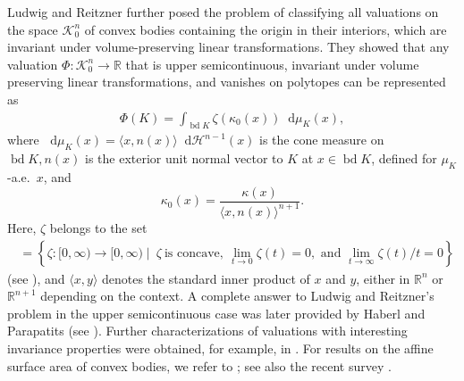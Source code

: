 \documentclass[11pt]{article}
\theoremstyle{definition} %
\newcommand{\dif}{\mathop{}\!\mathrm{d}}
\DeclareMathOperator{\bd}{bd}
\DeclareMathOperator{\conc}{Conc([0,\infty))}
\begin{document}
Ludwig and Reitzner \cite{ludwig2010classification} 
further posed the problem of classifying all valuations on the space $\mathcal{K}_0^n$  of convex bodies containing the origin in their interiors, which are invariant under volume-preserving linear transformations. They showed that any valuation $\Phi: \mathcal{K}_0^n\rightarrow \mathbb{R}$ that is  upper semicontinuous, invariant under volume preserving linear transformations, and  vanishes on polytopes can be represented as
\begin{align*}
    \Phi(K)= \int_{\bd K} \zeta(\kappa_0(x))\dif \mu_K(x),
\end{align*}
where $\dif \mu_K(x)=\langle x,n(x)\rangle \dif \mathcal{H}^{n-1}(x)$ is the cone measure on $\bd K, n(x)$ is the exterior  unit normal vector to $K$ at $x\in\bd K$,  defined for $\mu_K$-a.e.\ $x$, and 
$$\kappa_0(x)=\frac{\kappa(x)}{\langle x,n(x)\rangle^{n+1}}.$$
Here, $\zeta$ belongs to the set
\begin{align}\label{concave}
\conc=\left\{\zeta: [0,\infty)\rightarrow [0,\infty)\mid \ \zeta \ \mbox{is concave}, \ \lim_{t\rightarrow 0}\zeta(t)=0,  \mbox{ and } \lim_{t\rightarrow \infty}\zeta(t)/t =0\right\}   
\end{align}
(see \cite{ludwig2010classification, ludwig2001semicontinuity}), and   $\langle x,y \rangle$ denotes  the standard inner product of $x$ and $y$, either in $\mathbb{R}^n$ or  $\mathbb{R}^{n+1}$ depending on the context. A complete answer to Ludwig and Reitzner’s problem in the upper semicontinuous case was later provided by Haberl and Parapatits (see \cite{haberl2014centro}).  Further characterizations of valuations with interesting invariance properties were obtained, for example, in \cite{alesker,haberl, haberl2, hadwiger1957vorlesungen,klain,L, mullen,mullen2}. For results on the affine surface area of convex bodies, we refer to \cite{ludwig1999characterization, lutwak1991extended, schuett1990convex}; see also the recent survey \cite{schuett2023affine}.
\end{document}
